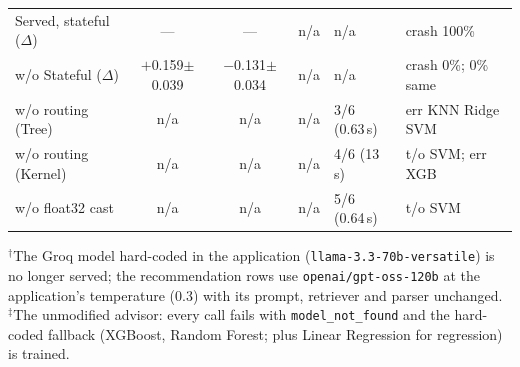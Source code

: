\begin{table}[t]
\begin{tabular}{@{}lcccl>{\raggedright\arraybackslash}p{2.0cm}@{}}
Served, stateful ($\Delta$) & --- & --- & n/a & n/a & crash 100\% \\
\quad w/o Stateful ($\Delta$) & $+$0.159$\pm$0.039 & $-$0.131$\pm$0.034 & n/a & n/a & crash 0\%; 0\% same \\
\quad w/o routing (Tree) & n/a & n/a & n/a & 3/6 (0.63\,s) & err KNN Ridge SVM \\
\quad w/o routing (Kernel) & n/a & n/a & n/a & 4/6 (13\,s) & t/o SVM; err XGB \\
\quad w/o float32 cast & n/a & n/a & n/a & 5/6 (0.64\,s) & t/o SVM \\
\hline
\end{tabular}
\par\smallskip
\parbox{\textwidth}{\scriptsize $^\dagger$The Groq model hard-coded in the application (\texttt{llama-3.3-70b-versatile}) is no longer served; the recommendation rows use \texttt{openai/\allowbreak gpt-oss-120b} at the application's temperature (0.3) with its prompt, retriever and parser unchanged. $^\ddagger$The unmodified advisor: every call fails with \texttt{model\_not\_found} and the hard-coded fallback (XGBoost, Random Forest; plus Linear Regression for regression) is trained.}
\end{table}
